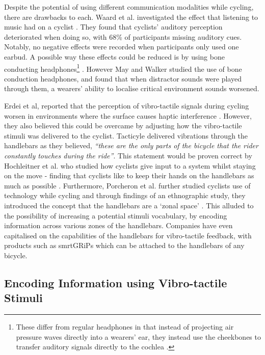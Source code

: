\documentclass{interim}
\begin{document}
Despite the potential of using different communication modalities while cycling, there are drawbacks to each. Waard et al. investigated the effect that listening to music had on a cyclist \cite{DEWAARD2011626}. They found that cyclists' auditory perception deteriorated when doing so, with 68\% of participants missing auditory cues. Notably, no negative effects were recorded when participants only used one earbud.
A possible way these effects could be reduced is by using bone conducting headphones\footnote{These differ from regular headphones in that instead of projecting air pressure waves directly into a wearers' ear, they instead use the cheekbones to transfer auditory signals directly to the cochlea \cite{littler1952hearing}.} \cite{wolfe2016distracted}. However May and Walker \cite{may2017effects} studied the use of bone conduction headphones, and found that when distractor sounds were played through them, a wearers' ability to localise critical environment sounds worsened.

Erdei et al, reported that the perception of vibro-tactile signals during cycling worsen in environments where the surface causes haptic interference \cite{erdei2020comparing, doi:10.1080/15389588.2021.1985113}. However, they also believed this could be overcame by adjusting how the vibro-tactile stimuli was delivered to the cyclist. Tacticyle \cite{10.1145/2371574.2371631} delivered vibrations through the handlebars as they believed, \textit{“these are the only parts of the bicycle that the rider constantly touches during the ride”}. This statement would be proven correct by Hochleitner et al. who studied how cyclists give input to a system whilst staying on the move - finding that cyclists like to keep their hands on the handlebars as much as possible \cite{10.1145/3152832.3152871}. Furthermore, Porcheron et al. further studied cyclists use of technology while cycling and through findings of an ethnographic study, they introduced the concept that the handlebars are a ‘zonal space’ \cite{10.1145/3544548.3580971}. This alluded to the possibility of increasing a potential stimuli vocabulary, by encoding information across various zones of the handlebars. Companies have even capitalised on the capabilities of the handlebars for vibro-tactile feedback, with products such as smrtGRiPs \cite{smartgrips} which can be attached to the handlebars of any bicycle.


\subsection{Encoding Information using Vibro-tactile Stimuli}
\end{document}
